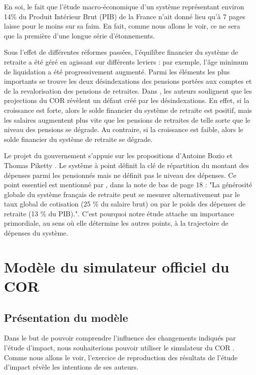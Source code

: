 \documentclass[10pt]{article}
\begin{document}
En soi, le fait que l'étude macro-économique d'un système représentant environ 14\% 
du Produit Intérieur Brut (PIB) de la France n'ait donné lieu qu'à 7 pages laisse pour le 
moins sur sa faim. 
En fait, comme nous allons le voir, ce ne sera que la première d'une longue 
série d'étonnements. 

Sous l'effet de différentes réformes passées, l'équilibre financier du système 
de retraite a été géré en agissant sur différents 
leviers : par exemple, l'âge minimum de liquidation a été progressivement augmenté. 
Parmi les éléments les plus importants se trouve les deux désindexations 
des pensions portées aux comptes et de la revalorisation des pensions de retraites. 
Dans \cite{Gannon2019}, les auteurs soulignent que les 
projections du COR révèlent un défaut créé par les désindexations. 
En effet, si la croissance est forte, alors le solde financier 
du système de retraite est positif, mais les salaires augmentent plus vite que 
les pensions de retraites de telle sorte que le niveau des pensions se dégrade. 
Au contraire, si la croissance est faible, alors le solde financier du système 
de retraite se dégrade. 

Le projet du gouvernement s'appuie sur les propositions d'Antoine 
Bozio et Thomas Piketty \cite{Bozio2008}. 
Le système à point définit la clé de répartition du montant des dépenses 
parmi les pensionnés mais ne définit pas le niveau des dépenses. 
Ce point essentiel est mentionné par \cite{Bozio2008}, dans la note de 
bas de page 18 : "La générosité globale du système français de retraite 
peut se mesurer alternativement par le taux global de cotisation (25 \% du salaire brut) 
ou par le poids des dépenses de retraite (13 \% du PIB).". 
C'est pourquoi notre étude attache un importance primordiale, au sens où elle 
détermine les autres points, à la trajectoire de dépenses du système. 


\section{Modèle du simulateur officiel du COR}

\subsection{Présentation du modèle}

Dans le but de pouvoir comprendre l'influence des changements indiqués par 
l'étude d'impact, nous souhaiterions pouvoir utiliser le simulateur du COR 
\cite{SimulateurCOR}. 
Comme nous allons le voir, l'exercice de reproduction des résultats 
de l'étude d'impact révèle les intentions de ses auteurs. 
\end{document}
